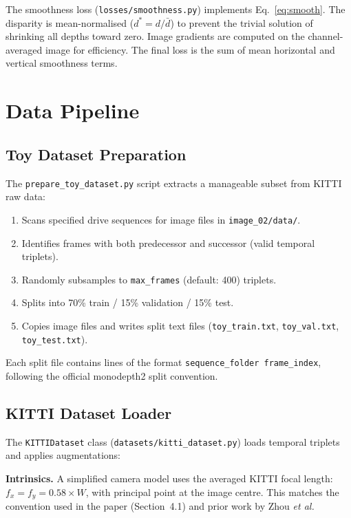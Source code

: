 \documentclass[10pt, a4paper, twocolumn]{article}
\begin{document}
The smoothness loss (\texttt{losses/smoothness.py}) implements Eq.~\ref{eq:smooth}. The disparity is mean-normalised ($d^* = d/\bar{d}$) to prevent the trivial solution of shrinking all depths toward zero. Image gradients are computed on the channel-averaged image for efficiency. The final loss is the sum of mean horizontal and vertical smoothness terms.

\section{Data Pipeline}
\label{sec:data}

\subsection{Toy Dataset Preparation}

The \texttt{prepare\_toy\_dataset.py} script extracts a manageable subset from KITTI raw data:

\begin{enumerate}[noitemsep]
    \item Scans specified drive sequences for image files in \texttt{image\_02/data/}.
    \item Identifies frames with both predecessor and successor (valid temporal triplets).
    \item Randomly subsamples to \texttt{max\_frames} (default: 400) triplets.
    \item Splits into 70\% train / 15\% validation / 15\% test.
    \item Copies image files and writes split text files (\texttt{toy\_train.txt}, \texttt{toy\_val.txt}, \texttt{toy\_test.txt}).
\end{enumerate}

Each split file contains lines of the format \texttt{sequence\_folder frame\_index}, following the official monodepth2 split convention.

\subsection{KITTI Dataset Loader}

The \texttt{KITTIDataset} class (\texttt{datasets/kitti\_dataset.py}) loads temporal triplets and applies augmentations:

\textbf{Intrinsics.} A simplified camera model uses the averaged KITTI focal length: $f_x = f_y = 0.58 \times W$, with principal point at the image centre. This matches the convention used in the paper (Section~4.1) and prior work by Zhou \textit{et al.}
\end{document}
